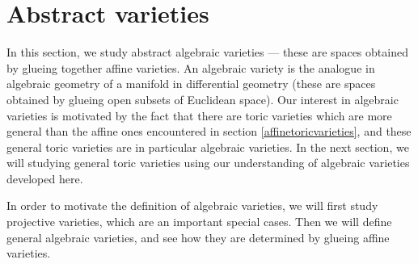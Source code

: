 \documentclass[12pt]{amsart}
\theoremstyle{plain}
\begin{document}

\newpage
\section{Abstract varieties}
In this section, we study abstract algebraic varieties --- these are spaces obtained by glueing together affine varieties.
An algebraic variety is the analogue in algebraic geometry of a manifold in differential geometry (these are spaces obtained by glueing open subsets of Euclidean space).
Our interest in algebraic varieties is motivated by the fact that there are toric varieties which are more general than the affine ones encountered in section \ref{affinetoricvarieties}, and these general toric varieties are in particular algebraic varieties. 
In the next section, we will studying general toric varieties using our understanding of algebraic varieties developed here.

In order to motivate the definition of algebraic varieties, we will first study projective varieties, which are an important special cases.
Then we will define general algebraic varieties, and see how they are determined by glueing affine varieties.
\end{document}
